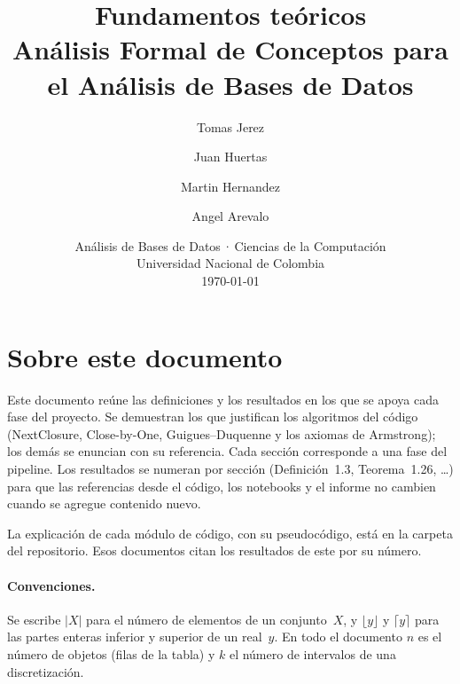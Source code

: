 \documentclass[11pt, letterpaper]{article}
\title{Fundamentos teóricos\\[0.5em]
  \large Análisis Formal de Conceptos para el Análisis de Bases de Datos}
\author{Tomas Jerez \and Juan Huertas \and Martin Hernandez \and Angel Arevalo}
\date{\small Análisis de Bases de Datos\,·\,Ciencias de la Computación\\
  Universidad Nacional de Colombia\\[0.8em]
  \today}
\begin{document}
\maketitle

\section*{Sobre este documento}

Este documento reúne las definiciones y los resultados en los que se apoya cada fase del proyecto. Se demuestran los que justifican los algoritmos del código (NextClosure, Close-by-One, Guigues--Duquenne y los axiomas de Armstrong); los demás se enuncian con su referencia. Cada sección corresponde a una fase del pipeline. Los resultados se numeran por sección (Definición~1.3, Teorema~1.26, \dots) para que las referencias desde el código, los notebooks y el informe no cambien cuando se agregue contenido nuevo.

La explicación de cada módulo de código, con su pseudocódigo, está en la carpeta  del repositorio. Esos documentos citan los resultados de este por su número.

\paragraph{Convenciones.} Se escribe $\lvert X \rvert$ para el número de elementos de un conjunto~$X$, y $\lfloor y \rfloor$ y $\lceil y \rceil$ para las partes enteras inferior y superior de un real~$y$. En todo el documento $n$ es el número de objetos (filas de la tabla) y $k$ el número de intervalos de una discretización.

\tableofcontents









\printbibliography[heading=bibintoc, title={Referencias}]
\end{document}
